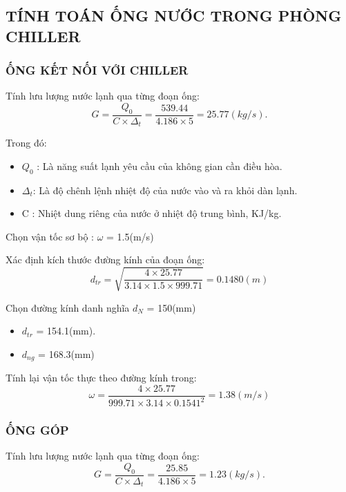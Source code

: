 \subsection{TÍNH TOÁN ỐNG NƯỚC TRONG PHÒNG CHILLER}

\subsubsection{ỐNG KẾT NỐI VỚI CHILLER}

Tính lưu lượng nước lạnh qua từng đoạn ống:
\begin{equation*}
	G = \dfrac{Q_{0}}{C \times \Delta_{t}} =\dfrac{539.44}{4.186 \times 5} = 25.77(kg/s).
\end{equation*}

Trong đó:
\begin{itemize}
	\item $Q_{0}$ : Là năng suất lạnh yêu cầu của không gian cần điều hòa.
	\item $\Delta_{t}$: Là độ chênh lệnh nhiệt độ của nước vào và ra khỏi dàn lạnh.
	\item C : Nhiệt dung riêng của nước ở nhiệt độ trung bình, KJ/kg.
\end{itemize}

Chọn vận tốc sơ bộ : $\omega$ = 1.5(m/s)

Xác định kích thước đường kính của đoạn ống:
\begin{equation*}
	d_{tr} = \sqrt{\dfrac{4 \times 25.77}{3.14 \times 1.5 \times 999.71}} = 0.1480(m)
\end{equation*}

Chọn đường kính danh nghĩa $d_{N}$ = 150(mm)
\begin{itemize}
	\item $d_{tr}$ = 154.1(mm).
	\item $d_{ng}$ = 168.3(mm)
\end{itemize}

Tính lại vận tốc thực theo đường kính trong:
\begin{equation*}
	\omega = \dfrac{4 \times 25.77 }{999.71 \times 3.14 \times 0.1541^{2}} = 1.38(m/s)
\end{equation*}

\subsubsection{ỐNG GÓP}

Tính lưu lượng nước lạnh qua từng đoạn ống:
\begin{equation*}
	G = \dfrac{Q_{0}}{C \times \Delta_{t}} =\dfrac{25.85}{4.186 \times 5} = 1.23(kg/s).
\end{equation*}

